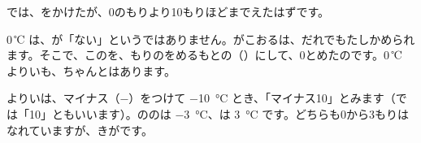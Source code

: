 

\leavevmode\label{bk:2-2:fu}\bkyattemiyouref では、をかけたが、0のもりより10もりほどまでえたはずです。

0\,℃ は、が「ない」というではありません。がこおるは、だれでもたしかめられます。そこで、このを、もりのをめるもとの（\textbf{}）にして、0とめたのです。0\,℃ よりいも、ちゃんとはあります。

よりいは、マイナス（$-$）をつけて \qty{-10}{\degreeCelsius} とき、「マイナス10」とみます（では「10」ともいいます）。\bkhatenaref ののは \qty{-3}{\degreeCelsius}、は \qty{3}{\degreeCelsius} です。どちらも0から3もりはなれていますが、きがです。

